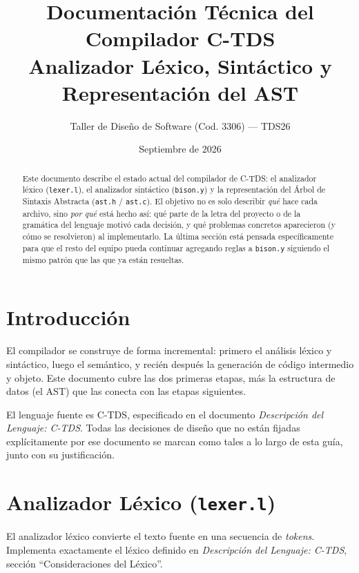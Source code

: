\documentclass[11pt,a4paper]{article}
\title{\textbf{Documentaci\'on T\'ecnica del Compilador C-TDS}\\
\large Analizador L\'exico, Sint\'actico y Representaci\'on del AST}
\author{Taller de Dise\~no de Software (Cod. 3306) --- TDS26}
\date{Septiembre de 2026}
\begin{document}
\maketitle

\begin{abstract}
\noindent
Este documento describe el estado actual del compilador de C-TDS: el analizador
l\'exico (\texttt{lexer.l}), el analizador sint\'actico (\texttt{bison.y}) y la
representaci\'on del \'Arbol de Sintaxis Abstracta (\texttt{ast.h} / \texttt{ast.c}).
El objetivo no es solo describir \emph{qu\'e} hace cada archivo, sino \emph{por qu\'e}
est\'a hecho as\'i: qu\'e parte de la letra del proyecto o de la gram\'atica del
lenguaje motiv\'o cada decisi\'on, y qu\'e problemas concretos aparecieron (y c\'omo
se resolvieron) al implementarlo. La \'ultima secci\'on est\'a pensada espec\'ificamente
para que el resto del equipo pueda continuar agregando reglas a \texttt{bison.y}
siguiendo el mismo patr\'on que las que ya est\'an resueltas.
\end{abstract}

\tableofcontents

\section{Introducci\'on}

El compilador se construye de forma incremental: primero el an\'alisis l\'exico y sint\'actico, luego el sem\'antico,
y reci\'en despu\'es la generaci\'on de c\'odigo intermedio y objeto. Este
documento cubre las dos primeras etapas, m\'as la estructura de datos
(el AST) que las conecta con las etapas siguientes.

El lenguaje fuente es C-TDS, especificado en el documento
\emph{Descripci\'on del Lenguaje: C-TDS}. Todas las decisiones de dise\~no
que no est\'an fijadas expl\'icitamente por ese documento se marcan como
tales a lo largo de esta gu\'ia, junto con su justificaci\'on.

\section{Analizador L\'exico (\texttt{lexer.l})}

El analizador l\'exico convierte el texto fuente en una secuencia de
\emph{tokens}. Implementa exactamente el l\'exico definido en
\emph{Descripci\'on del Lenguaje: C-TDS}, secci\'on ``Consideraciones del
L\'exico''.
\end{document}
